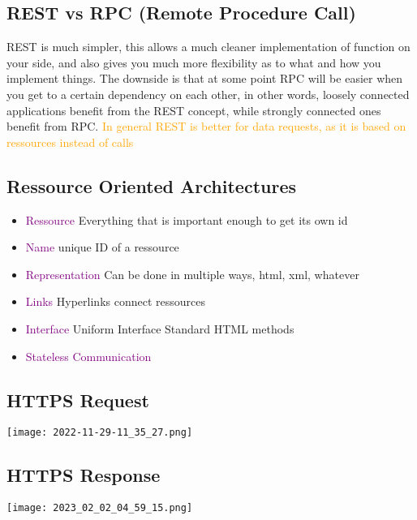 \documentclass[main.tex,fontsize=6pt,paper=a4,paper=landscape,DIV=calc,]{scrartcl}
\begin{document}
\begin{multicols*}{4}
\subsection{REST vs RPC (Remote Procedure Call)}  
REST is much simpler, this allows a much cleaner implementation of function on your side, and also gives you much more flexibility as to what and how you implement things. \newline
The downside is that at some point RPC will be easier when you get to a certain dependency on each other, in other words, loosely connected applications benefit from the REST concept, while strongly connected ones benefit from RPC.\newline 
\textcolor{orange}{In general REST is better for data requests, as it is based on ressources instead of calls}

\subsection{Ressource Oriented Architectures}  

\begin{itemize}
\item \textcolor{purple}{Ressource}\newline
  Everything that is important enough to get its own id
\item \textcolor{purple}{Name}\newline
  unique ID of a ressource
\item \textcolor{purple}{Representation}\newline
  Can be done in multiple ways, html, xml, whatever
\item \textcolor{purple}{Links}\newline
  Hyperlinks connect ressources
\item \textcolor{purple}{Interface}\newline
  Uniform Interface\newline
  Standard HTML methods
\item \textcolor{purple}{Stateless Communication}
\end{itemize} 

\subsection{HTTPS Request}  
\texttt{[image: 2022-11-29-11\_35\_27.png]}

\subsection{HTTPS Response}
\texttt{[image: 2023\_02\_02\_04\_59\_15.png]}


\end{multicols*}
\end{document}
